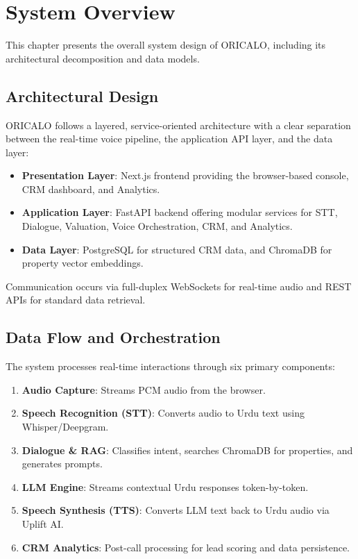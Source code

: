 \chapter{System Overview}
\label{ch:system-overview}

This chapter presents the overall system design of ORICALO, including its architectural decomposition and data models.

\section{Architectural Design}

ORICALO follows a layered, service-oriented architecture with a clear separation between the real-time voice pipeline, the application API layer, and the data layer:

\begin{itemize}
    \item \textbf{Presentation Layer}: Next.js frontend providing the browser-based console, CRM dashboard, and Analytics.
    \item \textbf{Application Layer}: FastAPI backend offering modular services for STT, Dialogue, Valuation, Voice Orchestration, CRM, and Analytics.
    \item \textbf{Data Layer}: PostgreSQL for structured CRM data, and ChromaDB for property vector embeddings.
\end{itemize}

Communication occurs via full-duplex WebSockets for real-time audio and REST APIs for standard data retrieval. 

\section{Data Flow and Orchestration}

The system processes real-time interactions through six primary components:
\begin{enumerate}
    \item \textbf{Audio Capture}: Streams PCM audio from the browser.
    \item \textbf{Speech Recognition (STT)}: Converts audio to Urdu text using Whisper/Deepgram.
    \item \textbf{Dialogue \& RAG}: Classifies intent, searches ChromaDB for properties, and generates prompts.
    \item \textbf{LLM Engine}: Streams contextual Urdu responses token-by-token.
    \item \textbf{Speech Synthesis (TTS)}: Converts LLM text back to Urdu audio via Uplift AI.
    \item \textbf{CRM Analytics}: Post-call processing for lead scoring and data persistence.
\end{enumerate}

